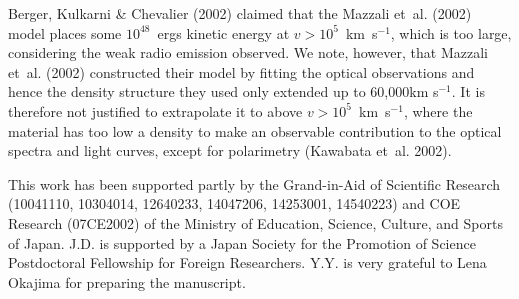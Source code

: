 \documentclass[10pt,preprint2]{aastex}
\begin{document}
Berger, Kulkarni \& Chevalier (2002) claimed that the Mazzali
et~al. (2002) model places some $10^{48}$~ergs kinetic energy at
$v > 10^5$~km~s$^{-1}$, which is too large, considering the weak
radio emission observed. We note, however, that Mazzali et~al.
(2002) constructed their model by fitting the optical observations
and hence the density structure they used only extended up to
60,000km s$^{-1}$. It is therefore not justified to extrapolate it
to above $v > 10^5$~km~s$^{-1}$, where the material has too low a
density to make an observable contribution to the optical spectra
and light curves, except for polarimetry (Kawabata et~al. 2002).


\acknowledgements

This work has been supported partly by the Grand-in-Aid of
Scientific Research (10041110, 10304014, 12640233, 14047206, 14253001,
14540223) and COE Research (07CE2002) of the Ministry of Education,
Science, Culture, and Sports of Japan. J.D. is supported by a Japan
Society for the Promotion of Science Postdoctoral Fellowship for
Foreign Researchers.  Y.Y. is very grateful to Lena Okajima for
preparing the manuscript.
\newpage

\end{document}
